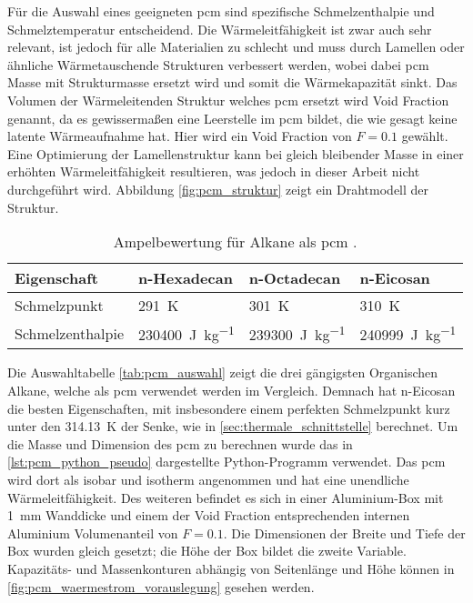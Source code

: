 Für die Auswahl eines geeigneten \ac{pcm} sind spezifische Schmelzenthalpie und Schmelztemperatur entscheidend.
Die Wärmeleitfähigkeit ist zwar auch sehr relevant, ist jedoch für alle Materialien zu schlecht und muss durch Lamellen oder ähnliche Wärmetauschende Strukturen verbessert werden,
wobei dabei \ac{pcm} Masse mit Strukturmasse ersetzt wird und somit die Wärmekapazität sinkt. Das Volumen der Wärmeleitenden Struktur welches
\ac{pcm} ersetzt wird Void Fraction genannt, da es gewissermaßen eine Leerstelle im \ac{pcm} bildet, die wie gesagt keine latente Wärmeaufnahme hat. Hier
wird ein Void Fraction von $F = 0.1$ gewählt. Eine Optimierung der Lamellenstruktur kann bei gleich bleibender Masse in einer erhöhten
Wärmeleitfähigkeit resultieren, was jedoch in dieser Arbeit nicht durchgeführt wird. Abbildung \ref{fig:pcm_struktur} zeigt ein Drahtmodell der Struktur.

\begin{table}
  \centering
  \caption{Ampelbewertung für Alkane als \ac{pcm} \cite{NIST}.}\label{tab:pcm_auswahl}
  \label{tab:pcm_alkane_nist}
  \begin{tabular}{>{\raggedright\arraybackslash}m{3.1cm} m{3.1cm} m{3.1cm} m{3.1cm}}
    \toprule[1pt]
    Eigenschaft & n-Hexadecan & n-Octadecan & n-Eicosan \\
    \midrule[0.5pt]

    Schmelzpunkt
      & \cellcolor{bad}\SI{291}{\kelvin}
      & \cellcolor{medium}\SI{301}{\kelvin}
      & \cellcolor{good}\SI{310}{\kelvin} \\

    Schmelzenthalpie
      & \cellcolor{bad}\SI{230400}{\joule\per\kilo\gram}
      & \cellcolor{medium}\SI{239300}{\joule\per\kilo\gram}
      & \cellcolor{good}\SI{240999}{\joule\per\kilo\gram} \\
    \bottomrule[1pt]
  \end{tabular}
\end{table}

Die Auswahltabelle \ref{tab:pcm_auswahl} zeigt die drei gängigsten Organischen Alkane, welche als \ac{pcm} verwendet werden im Vergleich.
Demnach hat n-Eicosan die besten Eigenschaften, mit insbesondere einem perfekten Schmelzpunkt kurz unter den \SI{314,13}{\kelvin} der Senke,
wie in \ref{sec:thermale_schnittstelle} berechnet.
Um die Masse und Dimension des \ac{pcm} zu berechnen wurde das in \ref{lst:pcm_python_pseudo} dargestellte Python-Programm verwendet.
Das \ac{pcm} wird dort als isobar und isotherm angenommen und hat eine unendliche Wärmeleitfähigkeit. Des weiteren befindet es sich
in einer Aluminium-Box mit \SI{1}{\milli\meter} Wanddicke und einem der Void Fraction entsprechenden internen Aluminium Volumenanteil von $F = 0.1$.
Die Dimensionen der Breite und Tiefe der Box wurden gleich gesetzt; die Höhe der Box bildet die zweite Variable.
Kapazitäts- und Massenkonturen abhängig von Seitenlänge und Höhe können in \ref{fig:pcm_waermestrom_vorauslegung} gesehen werden.

